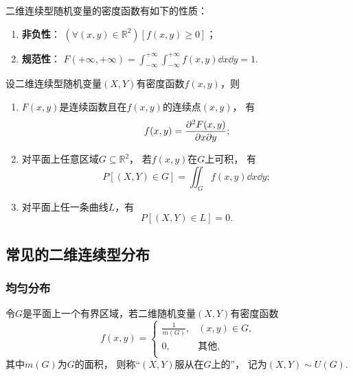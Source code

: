 \begin{property}
二维连续型随机变量的密度函数有如下的性质：
\begin{enumerate}
	\item {\rm\bf 非负性}：
	\((\forall (x,y)\in\mathbb{R}^2)[f(x,y) \geq 0]\)；

	\item {\rm\bf 规范性}：
	\(F(+\infty,+\infty)
	= \int_{-\infty}^{+\infty} \int_{-\infty}^{+\infty} f(x,y) \dd{x} \dd{y} = 1\).
\end{enumerate}
\end{property}

\begin{theorem}
设二维连续型随机变量\((X,Y)\)有密度函数\(f(x,y)\)，则
\begin{enumerate}
	\item \(F(x,y)\)是连续函数且在\(f(x,y)\)的连续点\((x,y)\)，
	有\begin{equation*}
		f(x,y) = \pdv{F(x,y)}{x}{y};
	\end{equation*}

	\item 对平面上任意区域\(G \subseteq \mathbb{R}^2\)，
	若\(f(x,y)\)在\(G\)上可积，
	有\begin{equation*}
		P\left[(X,Y) \in G\right] = \iint_G{f(x,y) \dd{x}\dd{y}};
	\end{equation*}

	\item 对平面上任一条曲线\(L\)，有\begin{equation*}
		P\left[(X,Y) \in L\right] = 0.
	\end{equation*}
\end{enumerate}
\end{theorem}

\subsection{常见的二维连续型分布}
\subsubsection{均匀分布}
\begin{definition}
令\(G\)是平面上一个有界区域，若二维随机变量\((X,Y)\)有密度函数\begin{equation*}
	f(x,y) = \left\{ \begin{array}{ll}
		\frac{1}{m(G)}, & (x,y) \in G, \\
		0, & \text{其他}, \\
	\end{array} \right.
\end{equation*}
其中\(m(G)\)为\(G\)的面积，
则称“\((X,Y)\)服从在\(G\)上的”，
记为\((X,Y) \sim U(G)\).
\end{definition}

